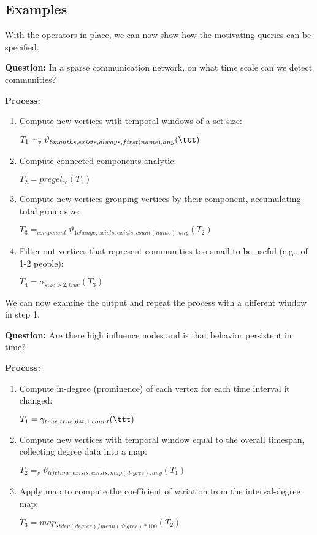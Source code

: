 \subsection{Examples}
\label{sec:example}

With the \ql operators in place, we can now show how the motivating
queries can be specified.

{\bf Question:} In a sparse communication network, on what time scale can we
detect communities?

{\bf Process:} 
\begin{enumerate}[noitemsep]
\item Compute new vertices with temporal windows of a set size:

$T_1 = _v\vartheta_{6 months,exists,always,first(name),any}( \ttt)$

\item Compute connected components analytic:

$T_2 = pregel_{cc} (T_1)$

\item Compute new vertices grouping vertices by their component,
  accumulating total group size:

$T_3 = _{component}\vartheta_{1 change,exists,exists,count(name),any}(T_2)$

\item Filter out vertices that represent communities too small to be
  useful (e.g., of 1-2 people):

$T_4 = \sigma_{size > 2,true}(T_3)$

\end{enumerate}

We can now examine the output and repeat the process with a different
window in step 1.


{\bf Question:} Are there high influence nodes and is that behavior
persistent in time?

{\bf Process:}
\begin{enumerate}[noitemsep]
\item Compute in-degree (prominence) of each vertex for each time
interval it changed:

$T_1 = \gamma_{true,true,dst,1,count}( \ttt)$

\item Compute new vertices with temporal window equal to the overall
  timespan, collecting degree data into a map:

$T_2 = _v\vartheta_{lifetime,exists,exists,map(degree),any}(T_1)$

\item Apply map to compute the coefficient of variation from the
  interval-degree map:

$T_3 = map_{stdev(degree)/mean(degree)*100}(T_2)$

\end{enumerate}

